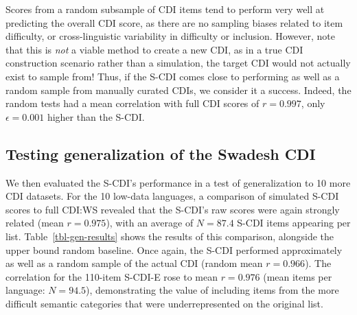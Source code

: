 \documentclass[
  letterpaper,
  DIV=11,
  numbers=noendperiod]{scrartcl}
\begin{document}
Scores from a random subsample of CDI items tend to perform very well at
predicting the overall CDI score, as there are no sampling biases
related to item difficulty, or cross-linguistic variability in
difficulty or inclusion. However, note that this is \emph{not} a viable
method to create a new CDI, as in a true CDI construction scenario
rather than a simulation, the target CDI would not actually exist to
sample from! Thus, if the S-CDI comes close to performing as well as a
random sample from manually curated CDIs, we consider it a success.
Indeed, the random tests had a mean correlation with full CDI scores of
\(r=0.997\), only \(\epsilon=0.001\) higher than the S-CDI.

\subsection{Testing generalization of the Swadesh
CDI}\label{testing-generalization-of-the-swadesh-cdi}

We then evaluated the S-CDI's performance in a test of generalization to
10 more CDI datasets. For the 10 low-data languages, a comparison of
simulated S-CDI scores to full CDI:WS revealed that the S-CDI's raw
scores were again strongly related (mean \(r=0.975\)), with an average
of \(N=87.4\) S-CDI items appearing per list.
Table~\ref{tbl-gen-results} shows the results of this comparison,
alongside the upper bound random baseline. Once again, the S-CDI
performed approximately as well as a random sample of the actual CDI
(random mean \(r=0.966\)). The correlation for the 110-item S-CDI-E rose
to mean \(r=0.976\) (mean items per language: \(N=94.5\)), demonstrating
the value of including items from the more difficult semantic categories
that were underrepresented on the original list.
\end{document}
